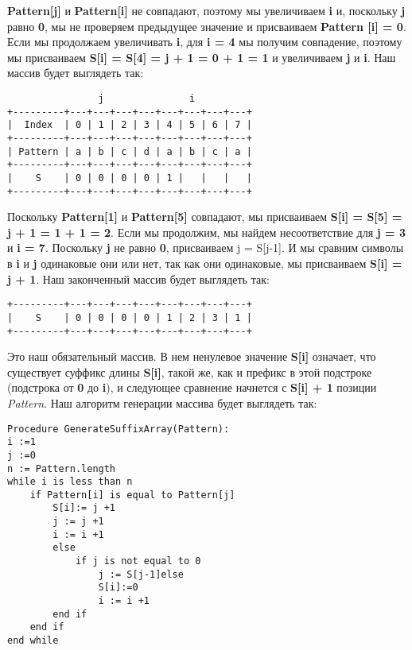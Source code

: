 \textbf{Pattern[j]} и \textbf{Pattern[i]} не совпадают, поэтому мы увеличиваем \textbf{i} и, поскольку \textbf{j} равно \textbf{0}, мы не проверяем
предыдущее значение и присваиваем \textbf{Pattern [i] = 0}. Если мы продолжаем увеличивать \textbf{i}, для \textbf{i = 4} мы
получим совпадение, поэтому мы присваиваем \textbf{S[i] = S[4] = j + 1 = 0 + 1 = 1} и увеличиваем \textbf{j} и \textbf{i}. Наш массив будет выглядеть так:
\vspace{\baselineskip}
\begin{tcolorbox}
\begin{verbatim}
                j               i
+---------+---+---+---+---+---+---+---+---+
|  Index  | 0 | 1 | 2 | 3 | 4 | 5 | 6 | 7 |
+---------+---+---+---+---+---+---+---+---+
| Pattern | a | b | c | d | a | b | c | a |
+---------+---+---+---+---+---+---+---+---+
|    S    | 0 | 0 | 0 | 0 | 1 |   |   |   |
+---------+---+---+---+---+---+---+---+---+
\end{verbatim}

\end{tcolorbox}
\vspace{\baselineskip}
Поскольку \textbf{Pattern[1]} и \textbf{Pattern[5]} совпадают, мы присваиваем \textbf{S[i] = S[5] = j + 1 = 1 + 1 = 2}. Если мы
продолжим, мы найдем несоответствие для \textbf{j = 3} и \textbf{i = 7}. Поскольку \textbf{j} не равно \textbf{0}, присваиваем j = S[j-1].
И мы сравним символы в \textbf{i} и \textbf{j} одинаковые они или нет, так как они одинаковые, мы присваиваем \textbf{S[i] = j
+ 1}. Наш законченный массив будет выглядеть так:
\vspace{\baselineskip}
\begin{tcolorbox}
\begin{verbatim}
+---------+---+---+---+---+---+---+---+---+
|    S    | 0 | 0 | 0 | 0 | 1 | 2 | 3 | 1 |
+---------+---+---+---+---+---+---+---+---+
\end{verbatim}
\end{tcolorbox}
\vspace{\baselineskip}
Это наш обязательный массив. В нем ненулевое значение \textbf{S[i]} означает, что существует суффикс длины
\textbf{S[i]}, такой же, как и префикс в этой подстроке (подстрока от \textbf{0} до \textbf{i}), и следующее сравнение начнется с
\textbf{S[i] + 1} позиции \textit{Pattern}. Наш алгоритм генерации массива будет выглядеть так:
\vspace{\baselineskip}
\begin{tcolorbox}
\begin{verbatim} 
Procedure GenerateSuffixArray(Pattern):
i :=1
j :=0
n := Pattern.length
while i is less than n
    if Pattern[i] is equal to Pattern[j]
        S[i]:= j +1
        j := j +1
        i := i +1
        else
            if j is not equal to 0
                j := S[j-1]else
                S[i]:=0 
                i := i +1
        end if 
    end if
end while
\end{verbatim}
\end{tcolorbox}
